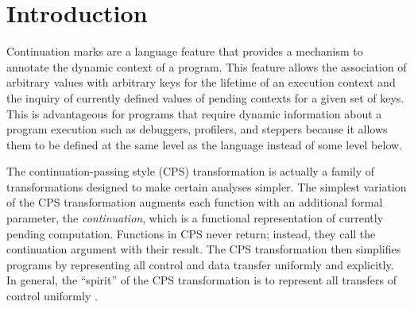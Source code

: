 \documentclass[11pt,ms]{byuprop}
\title{\Title}
\author{\Author}
\begin{document}
\maketitle



\section{Introduction}

Continuation marks \cite{clements2006portable} are a language feature that provides a
mechanism to annotate the dynamic context of a program. This feature allows the
association of arbitrary values with arbitrary keys for the lifetime of an execution
context and the inquiry of currently defined values of pending contexts for a given set of
keys. This is advantageous for programs that require dynamic information about a program
execution such as debuggers, profilers, and steppers because it allows them to be defined
at the same level as the language instead of some level below.

The continuation-passing style (CPS) transformation is actually a family of 
transformations designed to make certain analyses simpler. The simplest variation of the 
CPS transformation augments each function with an additional formal parameter, the 
\emph{continuation}, which is a functional representation of currently pending 
computation. Functions in CPS never return; instead, they call the continuation argument 
with their result. The CPS transformation then simplifies programs by representing all 
control and data transfer uniformly and explicitly. In general, the ``spirit'' of the 
CPS transformation is to represent all transfers of control uniformly \cite{sabry1994formal}.
\end{document}
